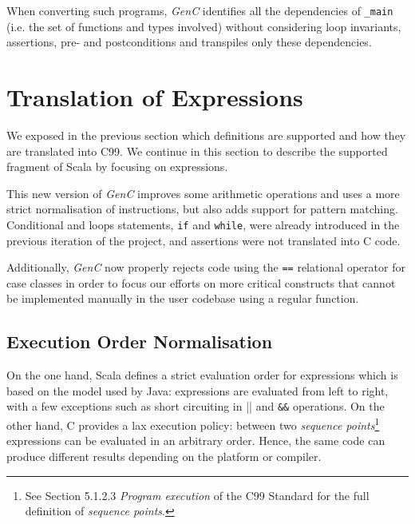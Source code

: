 \documentclass[a4paper,twoside]{article}
\newcommand{\InlineS}[1]{\lstinline[language=Leon]|#1|}
\let\oldsection\section
\renewcommand\section{\cleardoublepage\oldsection}
\newcommand{\GenC}{\emph{GenC}\xspace}
\begin{document}
When converting such programs, \GenC identifies all the dependencies of
\InlineS{_main} (i.e. the set of functions and types involved) without
considering loop invariants, assertions, pre- and postconditions and transpiles
only these dependencies.


\section{Translation of Expressions}
\label{translation_exprs}


We exposed in the previous section which definitions are supported and how they
are translated into C99. We continue in this section to describe the supported
fragment of Scala by focusing on expressions.

This new version of \GenC improves some arithmetic operations and uses a more
strict normalisation of instructions, but also adds support for pattern
matching. Conditional and loops statements, \InlineS{if} and \InlineS{while},
were already introduced in the previous iteration of the project, and assertions
were not translated into C code.

Additionally, \GenC now properly rejects code using the \InlineS{==} relational
operator for case classes in order to focus our efforts on more critical
constructs that cannot be implemented manually in the user codebase using a
regular function.


\subsection{Execution Order Normalisation}
\label{normalisation}

On the one hand, Scala defines a strict evaluation order for expressions which
is based on the model used by Java: expressions are evaluated from left to
right, with a few exceptions such as short circuiting in \InlineS{||} and
\InlineS{&&} operations. On the other hand, C provides a lax execution policy:
between two \emph{sequence points}\footnote{See Section 5.1.2.3 \emph{Program
execution} of the C99 Standard for the full definition of \emph{sequence
points}.} expressions can be evaluated in an arbitrary order. Hence, the same
code can produce different results depending on the platform or compiler.
\end{document}
